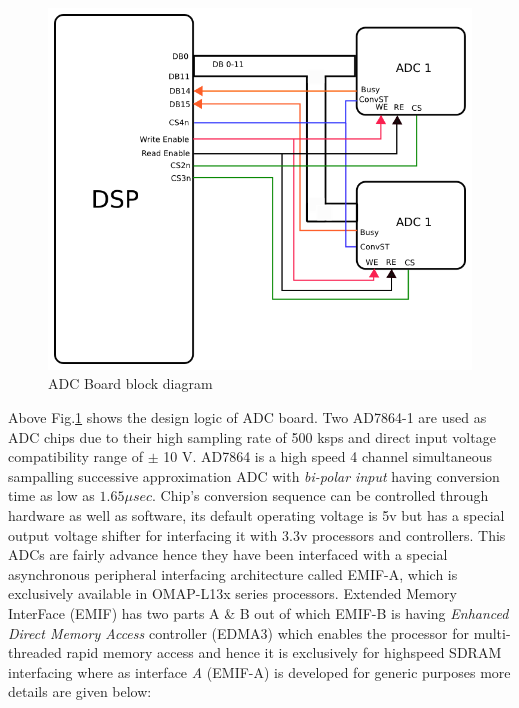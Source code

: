\begin{figure}[ht]
\includegraphics[width=\columnwidth]{fig/ADC_board.png}
\caption{ADC Board block diagram}
\label{fig:adc_board}
\end{figure}
Above Fig.\ref{fig:adc_board} shows the design logic of ADC board. Two AD7864-1 are used as ADC chips due to their high sampling rate of 500 ksps and direct input voltage compatibility range of $\pm$ 10 V. AD7864 is a high speed 4 channel simultaneous sampalling successive approximation ADC with \textit{bi-polar input} having conversion time as low as $1.65 \mu sec$. Chip's conversion sequence can be controlled through hardware as well as software, its default operating voltage is 5v but has a special output voltage shifter for interfacing it with 3.3v processors and controllers. This ADCs are fairly advance hence they have been interfaced with a special asynchronous peripheral interfacing architecture called EMIF-A, which is exclusively available in OMAP-L13x series processors. Extended Memory InterFace (EMIF) has two parts A \& B out of which EMIF-B is having \textit{Enhanced Direct Memory Access} controller (EDMA3) which enables the processor for multi-threaded rapid memory access and hence it is exclusively for highspeed SDRAM interfacing where as interface \textit{A} (EMIF-A) is developed for generic purposes more details are given below:

